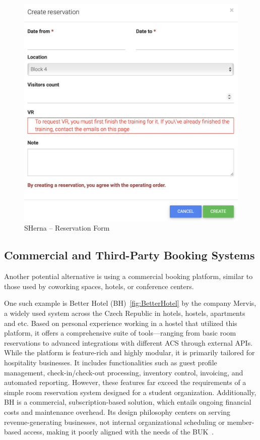 \begin{figure}[!htbp]
  \centering
  \includegraphics[width=\linewidth]{images/sherna-form}
  \caption{SHerna -- Reservation Form~\cite{SHerna}}
  \label{fig:SHernaForm}
\end{figure}

\subsection{Commercial and Third-Party Booking Systems}

Another potential alternative is using a commercial booking platform, similar to those used by coworking spaces, hotels, or conference centers.

One such example is Better Hotel (BH)~\ref{fig:BetterHotel} by the company Mervis, a widely used system across the Czech Republic in hotels, hostels, apartments and etc. Based on personal experience working in a hostel that utilized this platform, it offers a comprehensive suite of tools—ranging from basic room reservations to advanced integrations with different ACS through external APIs. While the platform is feature-rich and highly modular, it is primarily tailored for hospitality businesses. It includes functionalities such as guest profile management, check-in/check-out processing, inventory control, invoicing, and automated reporting. However, these features far exceed the requirements of a simple room reservation system designed for a student organization. Additionally, BH is a commercial, subscription-based solution, which entails ongoing financial costs and maintenance overhead. Its design philosophy centers on serving revenue-generating businesses, not internal organizational scheduling or member-based access, making it poorly aligned with the needs of the BUK~\cite{BetterHotel}.

